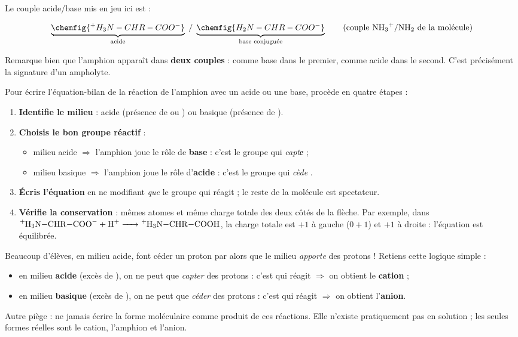 \documentclass[11pt]{article}
\begin{document}
Le couple acide/base mis en jeu ici est :

\[ \underbrace{\chemfig{^{+}H_3N-CHR-COO^{-}}}_{\text{acide}} \;/\; \underbrace{\chemfig{H_2N-CHR-COO^{-}}}_{\text{base conjuguée}} \qquad \text{(couple } \ce{NH3+}/\ce{NH2} \text{ de la molécule)} \]

Remarque bien que l'amphion apparaît dans \textbf{deux couples} : comme base dans le premier, comme acide dans le second. C'est précisément la signature d'un ampholyte.

\begin{methode}
Pour écrire l'équation-bilan de la réaction de l'amphion avec un acide ou une base, procède en quatre étapes :
\begin{enumerate}
\item \textbf{Identifie le milieu} : acide (présence de  ou ) ou basique (présence de ).
\item \textbf{Choisis le bon groupe réactif} :
\begin{itemize}
\item milieu acide $\Rightarrow$ l'amphion joue le rôle de \textbf{base} : c'est le groupe  qui \emph{captе}  ;
\item milieu basique $\Rightarrow$ l'amphion joue le rôle d'\textbf{acide} : c'est le groupe  qui \emph{cède} .
\end{itemize}
\item \textbf{Écris l'équation} en ne modifiant \emph{que} le groupe qui réagit ; le reste de la molécule est spectateur.
\item \textbf{Vérifie la conservation} : mêmes atomes et même charge totale des deux côtés de la flèche. Par exemple, dans $\ce{^{+}H3N-CHR-COO- + H+ -> ^{+}H3N-CHR-COOH}$, la charge totale est $+1$ à gauche ($0 + 1$) et $+1$ à droite : l'équation est équilibrée.
\end{enumerate}
\end{methode}

\begin{attention}
Beaucoup d'élèves, en milieu acide, font céder un proton par  alors que le milieu \emph{apporte} des protons ! Retiens cette logique simple :
\begin{itemize}
\item en milieu \textbf{acide} (excès de ), on ne peut que \emph{capter} des protons : c'est  qui réagit $\Rightarrow$ on obtient le \textbf{cation} ;
\item en milieu \textbf{basique} (excès de ), on ne peut que \emph{céder} des protons : c'est  qui réagit $\Rightarrow$ on obtient l'\textbf{anion}.
\end{itemize}
Autre piège : ne jamais écrire la forme moléculaire  comme produit de ces réactions. Elle n'existe pratiquement pas en solution ; les seules formes réelles sont le cation, l'amphion et l'anion.
\end{attention}
\end{document}
